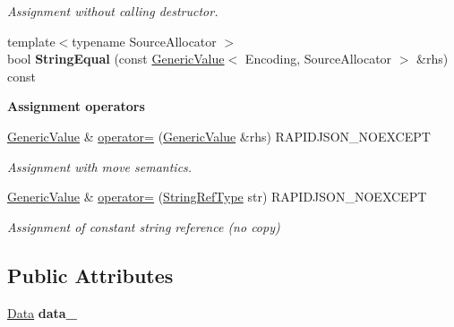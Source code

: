 \begin{DoxyCompactItemize}
\begin{DoxyCompactList}\small\item\em Assignment without calling destructor. \end{DoxyCompactList}\item 
{\footnotesize template$<$typename Source\+Allocator $>$ }\\bool {\bfseries String\+Equal} (const \hyperlink{a00130}{Generic\+Value}$<$ Encoding, Source\+Allocator $>$ \&rhs) const \hypertarget{a00130_a5ff908402687e14f5f14552ec58113a4}{}\label{a00130_a5ff908402687e14f5f14552ec58113a4}

\end{DoxyCompactItemize}
\begin{Indent}{\bf Assignment operators}\par
\begin{DoxyCompactItemize}
\item 
\hyperlink{a00130}{Generic\+Value} \& \hyperlink{a00130_a9018a40d7c52efc00daf803c51d3236c}{operator=} (\hyperlink{a00130}{Generic\+Value} \&rhs) R\+A\+P\+I\+D\+J\+S\+O\+N\+\_\+\+N\+O\+E\+X\+C\+E\+PT
\begin{DoxyCompactList}\small\item\em Assignment with move semantics. \end{DoxyCompactList}\item 
\hyperlink{a00130}{Generic\+Value} \& \hyperlink{a00130_a386708557555e6389184de608af5e6a6}{operator=} (\hyperlink{a00130_a32e0f30ee278072374c8168b14d3317f}{String\+Ref\+Type} str) R\+A\+P\+I\+D\+J\+S\+O\+N\+\_\+\+N\+O\+E\+X\+C\+E\+PT
\begin{DoxyCompactList}\small\item\em Assignment of constant string reference (no copy) \end{DoxyCompactList}\end{DoxyCompactItemize}
\end{Indent}
\subsection*{Public Attributes}
\begin{DoxyCompactItemize}
\item 
\hyperlink{a00071}{Data} {\bfseries data\+\_\+}\hypertarget{a00130_aaf80f2c91d26fdde60b9edeeecd3509f}{}\label{a00130_aaf80f2c91d26fdde60b9edeeecd3509f}

\end{DoxyCompactItemize}
